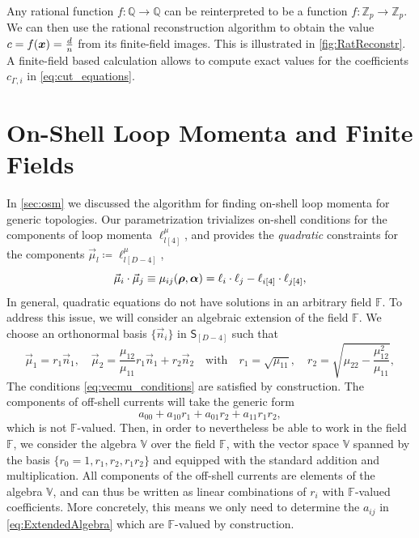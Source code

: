 Any rational function $f: \mathbb{Q} \longrightarrow \mathbb{Q}$ can be reinterpreted
to be a function $f: \mathbb{Z}_p \longrightarrow \mathbb{Z}_p$.
We can then use the rational reconstruction algorithm to obtain the value $c = f(\vb*{x}) = \frac{d}{n}$
from its finite-field images. This is illustrated in \cref{fig:RatReconstr}.
A finite-field based calculation allows to compute exact values
for the coefficients $c_{\Gamma,i}$ in \eqref{eq:cut_equations}.


\section{On-Shell Loop Momenta and Finite Fields}
\label{sec:muij_square_roots}

In \cref{sec:osm} we discussed the algorithm for
finding on-shell loop momenta for generic topologies.
Our parametrization trivializes on-shell conditions for the components
of loop momenta $\ell^{\mu}_{l[4]}$, and provides
the \emph{quadratic} constraints for the components $\vec{\mu}_l \coloneqq \ell^{\mu}_{l[D-4]}  $,
\begin{equation} \label{eq:vecmu_conditions}
  \va{\mu}_i \cdot \va{\mu}_j  \equiv  \mu_{ij} (\vb*{\rho},\vb*{\alpha}) = \ell_i\cdot \ell_j - \ell_{i[4]}\cdot \ell_{j[4]},
\end{equation}
In general, quadratic equations do not have solutions in an arbitrary field $\mathbb{F}$.
To address this issue, we will consider an algebraic extension of the field $\mathbb{F}$.
We choose an orthonormal
basis $\{\vec{n}_i\}$ in $\mathsf{S}_{[D-4]}$ such that
\begin{equation}
\vec{\mu}_1 = r_1 \vec{n}_1, \quad  \vec{\mu}_2 = \frac{\mu_{12}}{\mu_{11}} r_1 \vec{n}_1 + r_2 \vec{n}_2
  \quad \mathrm{with} \quad r_1 = \sqrt{\mu_{11}}, \quad r_2 = 
  \sqrt{\mu_{22} - \frac{\mu_{12}^2}{\mu_{11}}},
\end{equation}
The conditions \eqref{eq:vecmu_conditions} are satisfied by construction.
The components of off-shell currents will take the generic form
\begin{equation}
  \label{eq:ExtendedAlgebra}
  a_{00} + a_{10} r_1 + a_{01} r_2 + a_{11} r_1 r_2, 
\end{equation}
which is not $\mathbb{F}$-valued.
Then, in order to nevertheless be able to
work in the field $\mathbb{F}$, we consider 
the algebra $\mathbb{V}$ over the field $\mathbb{F}$, with 
the vector space $\mathbb{V}$ spanned by the basis 
$\{r_0=1,r_1,r_2,r_1r_2\}$ and equipped with the standard
addition and multiplication.
All components of the off-shell currents are elements 
of the algebra $\mathbb{V}$, and can thus be written as linear combinations
of $r_i$ with $\mathbb{F}$-valued coefficients. More
concretely, this means we only need to determine the $a_{ij}$ 
in \cref{eq:ExtendedAlgebra} which are $\mathbb{F}$-valued
by construction.

